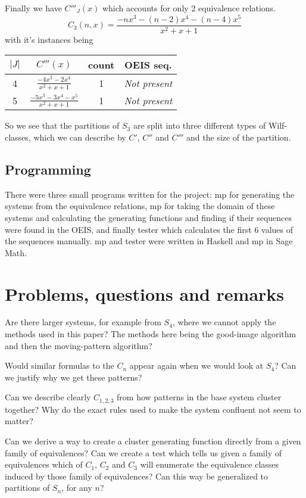 \documentclass[openany, a4paper, 11pt, english]{article}
\theoremstyle{definition}
\newcommand{\Sym}{S}
\begin{document}
Finally we have $C'''_J(x)$ which accounts for only 2 equivalence relations.
\[
    C_3(n,x) = \frac{-nx^3-(n-2)x^4-(n-4)x^5}{x^2+x+1}
\]
with it's instances being
\begin{center}
\begin{tabular}{c|c|c|c}
    $|J|$ & $C'''(x)$ & count & OEIS seq. \\
    \hline
    4 & $\frac{-4x^3-2x^4}{x^2+x+1}$ & 1 & \emph{Not present} \\ 
    5 & $\frac{-5x^3-3x^4-x^5}{x^2+x+1}$ & 1 & \emph{Not present}\\
\end{tabular}
\end{center}

So we see that the partitions of $\Sym_3$ are split into three different types
of Wilf-classes, which we can describe by $C'$, $C''$ and $C'''$ and the size
of the partition.

\subsection{Programming}
There were three small programs written for the project: mp for generating the
systems from the equivalence relations, mp for taking the domain of these
systems and calculating the generating functions and finding if their sequences
were found in the OEIS, and finally tester which calculates the first 6 values
of the sequences manually. mp and tester were written in Haskell and mp in Sage Math. 


\section{Problems, questions and remarks}
Are there larger systems, for example from $\Sym_4$, where we cannot apply the
methods used in this paper? The methods here being the good-image algorithm and
then the moving-pattern algorithm?

Would similar formulas to the $C_n$ appear again when we would
look at $\Sym_4$? Can we justify why we get these patterns?

Can we describe clearly $C_{1,2,3}$ from how patterns in the base system cluster together?
Why do the exact rules used to make the system confluent not seem to matter?

Can we derive a way to create a cluster generating function directly from a
given family of equivalences? Can we create a test which tells us given a family
of equivalences which of $C_1$, $C_2$ and $C_3$ will enumerate the equivalence
classes induced by those family of equivalences?
Can this way be generalized to partitions of $\Sym_n$, for any $n$?
\end{document}
